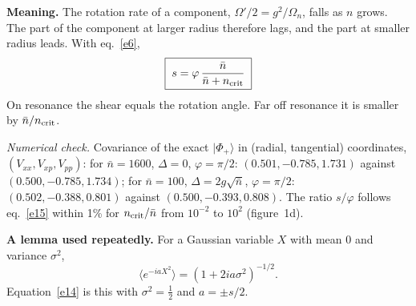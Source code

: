 \documentclass[11pt,letterpaper]{article}
\newcommand{\nbar}{\bar{n}}
\newcommand{\ncrit}{n_{\rm crit}}
\newcommand{\ket}[1]{|#1\rangle}
\newcommand{\numcheck}[1]{\par{\small\textit{Numerical check.} #1}\par}
\begin{document}
\textbf{Meaning.} The rotation rate of a component, $\Omega'/2=g^2/\Omega_n$, falls as $n$ grows. The
part of the component at larger radius therefore lags, and the part at smaller radius leads. With
eq.~\eqref{e6},
\begin{equation}\label{e15}
\boxed{\;s=\varphi\,\frac{\nbar}{\nbar+\ncrit}\;}
\end{equation}
On resonance the shear equals the rotation angle. Far off resonance it is smaller by $\nbar/\ncrit$.
\numcheck{Covariance of the exact $\ket{\Phi_+}$ in (radial, tangential) coordinates, $(V_{xx},V_{xp},V_{pp})$:
for $\nbar=1600$, $\Delta=0$, $\varphi=\pi/2$: $(0.501,-0.785,1.731)$ against $(0.500,-0.785,1.734)$;
for $\nbar=100$, $\Delta=2g\sqrt{\nbar}$, $\varphi=\pi/2$: $(0.502,-0.388,0.801)$ against $(0.500,-0.393,0.808)$.
The ratio $s/\varphi$ follows eq.~\eqref{e15} within 1\% for $\ncrit/\nbar$ from $10^{-2}$ to $10^{2}$ (figure~1d).}

\textbf{A lemma used repeatedly.} For a Gaussian variable $X$ with mean 0 and variance $\sigma^2$,
\begin{equation}\label{e16}
\bigl\langle e^{-iaX^2}\bigr\rangle=(1+2ia\sigma^2)^{-1/2}.
\end{equation}
Equation~\eqref{e14} is this with $\sigma^2=\tfrac12$ and $a=\pm s/2$.
\end{document}
